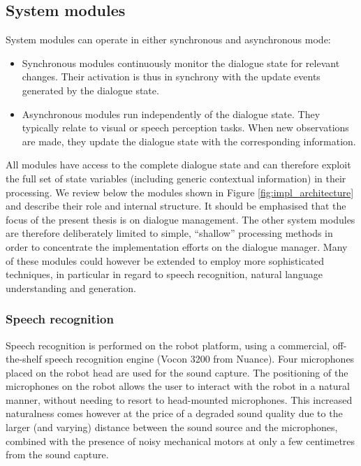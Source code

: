 \subsection{System modules}

System modules can operate in either synchronous and asynchronous mode: \begin{itemize}
\item Synchronous modules continuously monitor the dialogue state for relevant changes.  Their activation is thus in synchrony with the update events generated by the dialogue state.
\item Asynchronous modules run independently of the dialogue state.  They typically relate to visual or speech perception tasks. When new observations are made, they update the dialogue state with the corresponding information.
\end{itemize}

All modules have access to the complete dialogue state and can therefore exploit the full set of state variables (including generic contextual information) in their processing. We review below the modules shown in Figure \ref{fig:impl_architecture} and describe their role and internal structure. It should be emphasised that the focus of the present thesis is on dialogue management.  The other system modules are therefore deliberately limited to simple, ``shallow'' processing methods in order to concentrate the implementation efforts on the dialogue manager. Many of these modules could however be extended to employ more sophisticated techniques, in particular in regard to speech recognition, natural language understanding and generation. 

\subsubsection*{Speech recognition}

Speech recognition is performed on the robot platform, using a commercial, off-the-shelf speech recognition engine (Vocon 3200 from Nuance).  Four microphones placed on the robot head are used for the sound capture.  The positioning of the microphones on the robot allows the user to interact with the robot in a natural manner, without needing to resort to head-mounted microphones. This increased naturalness comes however at the price of a degraded sound quality due to the larger (and varying) distance between the sound source and the microphones, combined with the presence of noisy mechanical motors at only a few centimetres from the sound capture.

